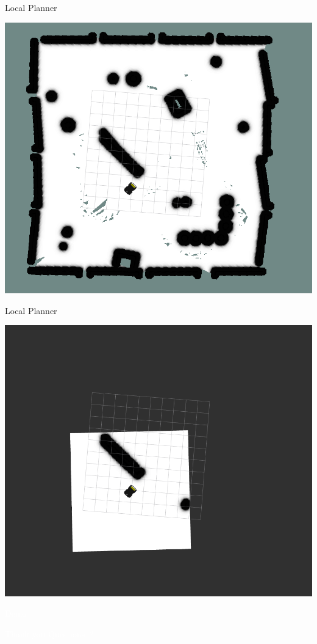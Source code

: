 \documentclass{beamer}
\begin{document}
\begin{frame}{Local Planner}
	\subtitle{Navigation Stack} 
	\centering
	\includegraphics[width=.7\linewidth]{figures/costmap_1.png}
\end{frame}
\begin{frame}{Local Planner}
	\subtitle{Navigation Stack} 
	\centering
	\includegraphics[width=.7\linewidth]{figures/costmap_2.png}
\end{frame}

\begin{frame}[plain]{}  
	\centering
	{\huge \textcolor{white}{Demo} }
\end{frame}


\begin{frame}[plain]{}  
	\centering
	{\huge \textcolor{white}{Thank you} }
	\linebreak
	\vspace{1.0cm}
	{\huge \textcolor{white}{Questions..?} }
\end{frame}
\end{document}
